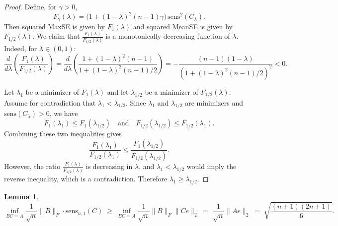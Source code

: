 \documentclass{article}
\theoremstyle{plain}
\newtheorem{lemma}[theorem]{Lemma}
\theoremstyle{definition}
\theoremstyle{remark}
\begin{document}
\MaxSEvsRMSEMinimizerInequality*
\begin{proof}
Define, for $\gamma>0$,
\begin{equation}
    F_{\gamma}(\lambda) = \bigl(1 + (1-\lambda)^2 (n-1)\gamma\bigr)\,\mathrm{sens}^2(C_{\lambda}).
\end{equation}
Then squared MaxSE is given by $F_1(\lambda)$ and squared MeanSE is given by $F_{1/2}(\lambda)$.
We claim that $\frac{F_1(\lambda)}{F_{1/2}(\lambda)}$ is a monotonically decreasing function of $\lambda$.
Indeed, for $\lambda\in(0,1)$:
\begin{equation}
\frac{d}{d\lambda}\left(\frac{F_1(\lambda)}{F_{1/2}(\lambda)}\right)
= \frac{d}{d\lambda}\left(\frac{1 + (1-\lambda)^2(n-1)}{1 + (1-\lambda)^2(n-1)/2}\right)
= -\frac{(n-1)(1-\lambda)}{\left(1+(1-\lambda)^2(n-1)/2\right)^2} < 0.
\end{equation}

Let $\lambda_1$ be a minimizer of $F_1(\lambda)$ and let $\lambda_{1/2}$ be a minimizer of $F_{1/2}(\lambda)$.
Assume for contradiction that $\lambda_1 < \lambda_{1/2}$.
Since $\lambda_1$ and $\lambda_{1/2}$ are minimizers and $\mathrm{sens}(C_{\lambda})>0$, we have
\begin{equation}
    F_{1}(\lambda_{1}) \le F_1(\lambda_{1/2})
    \quad\text{and}\quad
    F_{1/2}(\lambda_{1/2}) \le F_{1/2}(\lambda_{1}).
\end{equation}
Combining these two inequalities gives 
\begin{equation}
    \frac{F_{1}(\lambda_{1})}{F_{1/2}(\lambda_{1})}
    \le
    \frac{F_{1}(\lambda_{1/2})}{F_{1/2}(\lambda_{1/2})}.
\end{equation}
However, the ratio $\frac{F_1(\lambda)}{F_{1/2}(\lambda)}$ is decreasing in $\lambda$, and $\lambda_1 < \lambda_{1/2}$ would imply the reverse inequality, which is a contradiction.
Therefore $\lambda_1 \ge \lambda_{1/2}$.
\end{proof}


\begin{lemma}
\begin{equation}
    \inf_{BC=A}\frac{1}{\sqrt{n}}\|B\|_F \cdot \mathrm{sens}_{n,1}(C)
    \;\ge\;
    \inf_{BC=A}\frac{1}{\sqrt{n}}\|B\|_F \|Ce\|_2
    \;=\;
    \frac{1}{\sqrt{n}}\|Ae\|_2
    \;=\;
    \sqrt{\frac{(n+1)(2n+1)}{6}}.
\end{equation}
\end{lemma}
\end{document}
